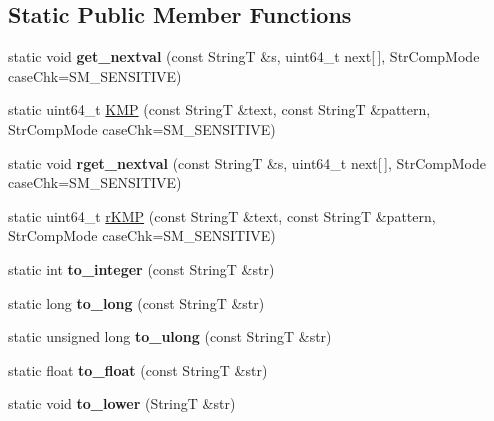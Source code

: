 \subsection*{Static Public Member Functions}
\begin{CompactItemize}
\item 
\hypertarget{classAlgorithm_cf32909208409a7e9a44870688efd919}{
static void \textbf{get\_\-nextval} (const StringT \&s, uint64\_\-t next\mbox{[}$\,$\mbox{]}, StrCompMode caseChk=SM\_\-SENSITIVE)}
\label{classAlgorithm_cf32909208409a7e9a44870688efd919}

\item 
static uint64\_\-t \hyperlink{classAlgorithm_9f7fcee0cfbabce55c5a9cabb1868f29}{KMP} (const StringT \&text, const StringT \&pattern, StrCompMode caseChk=SM\_\-SENSITIVE)
\item 
\hypertarget{classAlgorithm_207eb5ca98c395ebe066a44bf1a2d04f}{
static void \textbf{rget\_\-nextval} (const StringT \&s, uint64\_\-t next\mbox{[}$\,$\mbox{]}, StrCompMode caseChk=SM\_\-SENSITIVE)}
\label{classAlgorithm_207eb5ca98c395ebe066a44bf1a2d04f}

\item 
static uint64\_\-t \hyperlink{classAlgorithm_a3e24e19980c0dd29c80f9feff6e5191}{rKMP} (const StringT \&text, const StringT \&pattern, StrCompMode caseChk=SM\_\-SENSITIVE)
\item 
\hypertarget{classAlgorithm_8460fd980d7167c1b4a915204cc7df07}{
static int \textbf{to\_\-integer} (const StringT \&str)}
\label{classAlgorithm_8460fd980d7167c1b4a915204cc7df07}

\item 
\hypertarget{classAlgorithm_509971d56fef622fb2a932282b6e49ee}{
static long \textbf{to\_\-long} (const StringT \&str)}
\label{classAlgorithm_509971d56fef622fb2a932282b6e49ee}

\item 
\hypertarget{classAlgorithm_f782d0117e525f350cbc2a6b9766737a}{
static unsigned long \textbf{to\_\-ulong} (const StringT \&str)}
\label{classAlgorithm_f782d0117e525f350cbc2a6b9766737a}

\item 
\hypertarget{classAlgorithm_c702274e3932a6a3cc897fa8295c9d2f}{
static float \textbf{to\_\-float} (const StringT \&str)}
\label{classAlgorithm_c702274e3932a6a3cc897fa8295c9d2f}

\item 
\hypertarget{classAlgorithm_67299838db627baf19ef206e7f614e61}{
static void \textbf{to\_\-lower} (StringT \&str)}
\label{classAlgorithm_67299838db627baf19ef206e7f614e61}


\end{CompactItemize}
